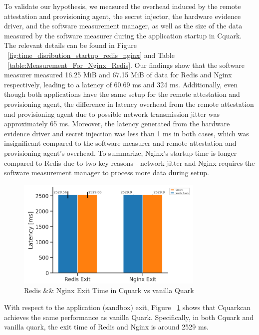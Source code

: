 To validate our hypothesis, we measured the overhead induced by the remote attestation and provisioning agent, the secret injector, the hardware evidence driver, and the software measurement manager, as well as the size of the data measured by the software measurer during the application 
startup in Cquark. The relevant details can be found in Figure  ~\ref{fig:time_disribution_startup_redis_nginx} and Table ~\ref{table:Measurement_For_Nginx_Redis}. Our findings show that the software measurer measured 16.25 MiB and 67.15 MiB of data for Redis and Nginx respectively, leading to a latency of 60.69 ms and 324 ms.   Additionally, even though both applications 
have the same setup for the remote attestation and provisioning agent, the difference in latency overhead from the remote attestation and provisioning agent due to possible network transmission jitter was approximately 65 ms. Moreover, the latency generated from the hardware evidence driver and 
secret injection was less than 1 ms in both cases, which was insignificant compared to the software measurer and remote attestation and provisioning agent's overhead. To summarize, Nginx's startup time is longer compared to Redis due to two key reasons - network jitter and Nginx requires the 
software measurement manager to process more data during setup.

\begin{figure}[H]
    \centering
    \includegraphics[width=0.8\textwidth]{images/reds_nginx_exit_comp.PNG}
    \caption[Redis \&\& Nginx Exit Time in Cquark vs vanilla Quark]{Redis \&\& Nginx Exit Time in Cquark vs vanilla Quark}
    \label{fig:reds_nginx_exit_comp}
\end{figure}


With respect to the application (sandbox) exit, Figure ~\ref{fig:reds_nginx_exit_comp}  shows that Cquarkcan achieves the same performance as vanilla Quark. Specifically, in both Cquark and vanilla quark, the exit time of Redis and Nginx is around 2529 ms.


